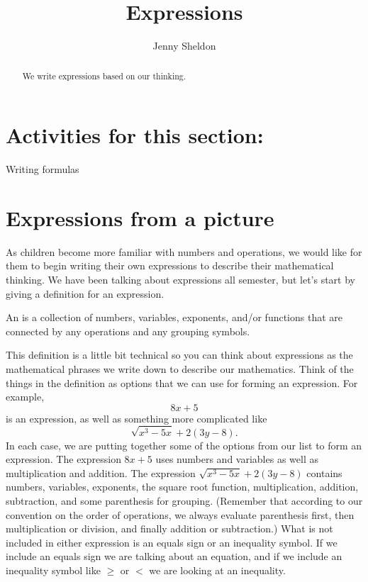 \documentclass{ximera}
\title{Expressions}
\author{Jenny Sheldon}
\begin{document}
\begin{abstract}
We write expressions based on our thinking.
\end{abstract}
\maketitle

\section{Activities for this section:} Writing formulas

\section{Expressions from a picture}

As children become more familiar with numbers and operations, we would like for them to begin writing their own expressions to describe their mathematical thinking. We have been talking about expressions all semester, but let's start by giving a definition for an expression.

\begin{definition}
An  is a collection of numbers, variables, exponents, and/or functions that are connected by any operations and any grouping symbols.
\end{definition}
This definition is a little bit technical so you can think about expressions as the mathematical phrases we write down to describe our mathematics. Think of the things in the definition as options that we can use for forming an expression. For example, 
\[
8x + 5
\]
is an expression, as well as something more complicated like
\[
\sqrt{x^3 - 5x} + 2(3y - 8).
\]
In each case, we are putting together some of the options from our list to form an expression. The expression $8x+5$ uses numbers and variables as well as multiplication and addition. The expression $\sqrt{x^3 - 5x} + 2(3y - 8)$ contains numbers, variables, exponents, the square root function, multiplication, addition, subtraction, and some parenthesis for grouping. (Remember that according to our convention on the order of operations, we always evaluate parenthesis first, then multiplication or division, and finally addition or subtraction.) What is not included in either expression is an equals sign or an inequality symbol. If we include an equals sign we are talking about an equation, and if we include an inequality symbol like $\geq$ or $<$ we are looking at an inequality.
\end{document}
